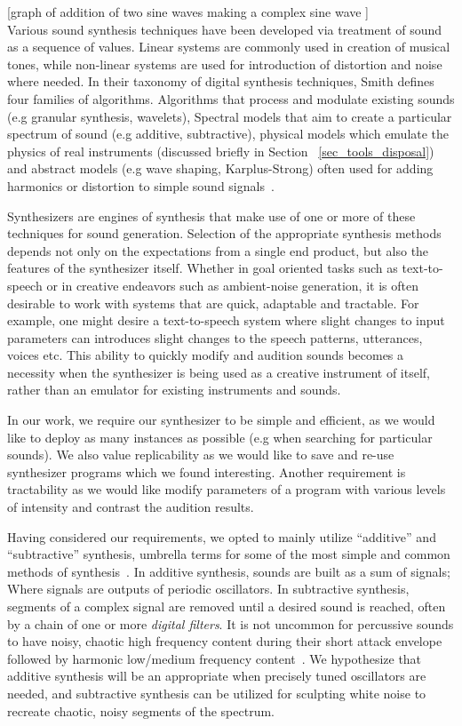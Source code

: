 \documentclass[\main/thesis.tex]{subfiles}
\begin{document}
[graph of addition of two sine waves making a complex sine wave ]
\\

Various sound synthesis techniques have been developed via treatment of sound as a sequence of values. Linear systems are commonly used in creation of musical tones, while non-linear systems are used for introduction of distortion and noise where needed. In their taxonomy of digital synthesis techniques, Smith defines four families of algorithms. Algorithms that process and modulate existing sounds (e.g granular synthesis, wavelets), Spectral models that aim to create a particular spectrum of sound (e.g additive, subtractive), physical models which emulate the physics of real instruments (discussed briefly in Section ~\ref{sec_tools_disposal}) and abstract models (e.g wave shaping, Karplus-Strong) often used for adding harmonics or distortion to simple sound signals~\cite{smith1991viewpoints}. 

Synthesizers are engines of synthesis that make use of one or more of these techniques for sound generation. Selection of the appropriate synthesis methods depends not only on the expectations from a single end product, but also the features of the synthesizer itself. Whether in goal oriented tasks such as text-to-speech or in creative endeavors such as ambient-noise generation, it is often desirable to work with systems that are quick, adaptable and tractable. For example, one might desire a text-to-speech system where slight changes to input parameters can introduces slight changes to the speech patterns, utterances, voices etc. This ability to quickly modify and audition sounds becomes a necessity when the synthesizer is being used as a creative instrument of itself, rather than an emulator for existing instruments and sounds. 

In our work, we require our synthesizer to be simple and efficient, as we would like to deploy as many instances as possible (e.g when searching for particular sounds). We also value replicability as we would like to save and re-use synthesizer programs which we found interesting. Another requirement is tractability as we would like modify parameters of a program with various levels of intensity and contrast the audition results.

Having considered our requirements, we opted to mainly utilize \enquote{additive} and \enquote{subtractive} synthesis, umbrella terms for some of the most simple and common methods of synthesis~\cite{mitchell2009basicsynthChap1}. 
In additive synthesis, sounds are built as a sum of signals; Where signals are outputs of periodic oscillators.  In subtractive synthesis, segments of a complex signal are removed until a desired sound is reached, often by a chain of one or more \textit{digital filters}. It is not uncommon for percussive sounds to have noisy, chaotic high frequency content during their short attack envelope followed by harmonic low/medium frequency content~\cite{lakatos2000common}. We hypothesize that additive synthesis will be an appropriate when precisely tuned oscillators are needed, and subtractive synthesis can be utilized for sculpting white noise to recreate chaotic, noisy segments of the spectrum.
\end{document}

